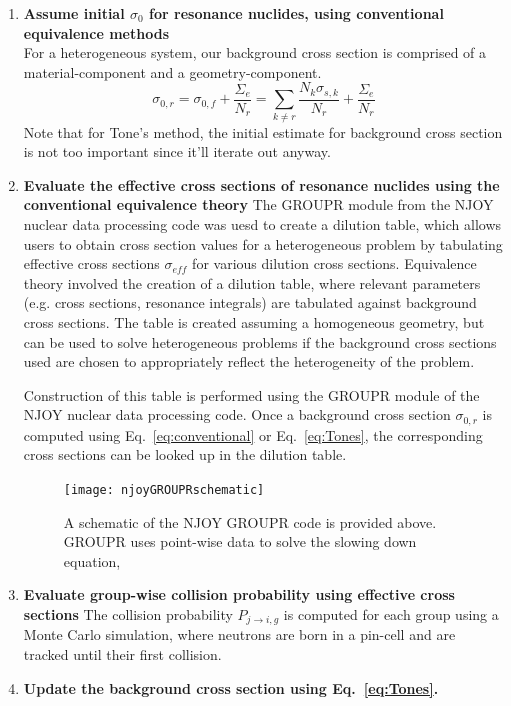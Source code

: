 \documentclass[10pt]{article}
\begin{document}
      \begin{enumerate}
        \item \textbf{Assume initial $\sigma_0$ for resonance nuclides, using conventional equivalence methods}\\
  For a heterogeneous system, our background cross section is comprised of a material-component and a geometry-component.
\begin{equation}\sigma_{0,r}=\sigma_{0,f}+\frac{\Sigma_e}{N_r}=\sum_{k\neq r}\frac{N_k\sigma_{s,k}}{N_r}+\frac{\Sigma_e}{N_r}\label{eq:conventional}\end{equation}
Note that for Tone's method, the initial estimate for background cross section is not too important since it'll iterate out anyway.

        \item \textbf{Evaluate the effective cross sections of resonance nuclides using the conventional equivalence theory}
          The GROUPR module from the NJOY nuclear data processing code was uesd to create a dilution table, which allows users to obtain cross section values for a heterogeneous problem by tabulating effective cross sections $\sigma_{eff}$ for various dilution cross sections. 
           Equivalence theory involved the creation of a dilution table, where relevant parameters (e.g. cross sections, resonance integrals) are tabulated against background cross sections. The table is created assuming a homogeneous geometry, but can be used to solve heterogeneous problems if the background cross sections used are chosen to appropriately reflect the heterogeneity of the problem. \par
           Construction of this table is performed using the GROUPR module of the NJOY nuclear data processing code. Once a background cross section $\sigma_{0,r}$ is computed using Eq.~\ref{eq:conventional} or Eq.~\ref{eq:Tones}, the corresponding cross sections can be looked up in the dilution table.
            \begin{figure}[H]
              \begin{center}
              \texttt{[image: njoyGROUPRschematic]}
                \caption{A schematic of the NJOY GROUPR code is provided above. GROUPR uses point-wise data to solve the slowing down equation, }
              \label{fig:njoySchematic}
              \end{center}
            \end{figure}


         \item \textbf{Evaluate group-wise collision probability using effective cross sections}
           The collision probability $P_{j\rightarrow i,g}$ is computed for each group using a Monte Carlo simulation, where neutrons are born in a pin-cell and are tracked until their first collision.
         \item \textbf{Update the background cross section using Eq.~\ref{eq:Tones}.}


\end{enumerate}
\end{document}
